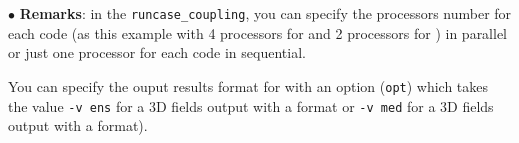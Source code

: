 $\bullet$ {\bf Remarks}: in the \texttt{runcase\_coupling}, you
can specify the processors number for each code (as this example
with 4 processors for \CS and 2 processors for \syrthes)
in parallel or just one processor for each code in sequential.

You can specify the ouput results format for \syrthes with an option
(\texttt{opt}) which takes the value \texttt{-v ens} for
a 3D fields output with a \ensight format or  \texttt{-v med} for
a 3D fields output with a \salome format).
\newpage
